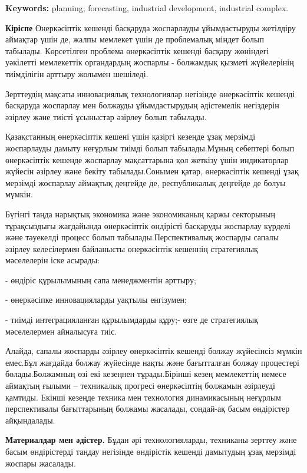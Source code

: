 {\bfseries Keywords:} planning, forecasting, industrial development,
industrial complex.
\begin{multicols}{2}

{\bfseries Кіріспе} Өнеркәсіптік кешенді басқаруда жоспарлауды
ұйымдастыруды жетілдіру аймақтар үшін де, жалпы мемлекет үшін де
проблемалық міндет болып табылады. Көрсетілген проблема өнеркәсіптік
кешенді басқару жөніндегі уәкілетті мемлекеттік органдардың жоспарлы -
болжамдық қызметі жүйелерінің тиімділігін арттыру жолымен шешіледі.

Зерттеудің мақсаты инновациялық технологиялар негізінде өнеркәсіптік
кешенді басқаруда жоспарлау мен болжауды ұйымдастырудың әдістемелік
негіздерін әзірлеу және тиісті ұсыныстар әзірлеу болып табылады.

Қазақстанның өнеркәсіптік кешені үшін қазіргі кезеңде ұзақ мерзімді
жоспарлауды дамыту неғұрлым тиімді болып табылады.Мұның себептері болып
өнеркәсіптік кешенде жоспарлау мақсаттарына қол жеткізу үшін
индикаторлар жүйесін әзірлеу және бекіту табылады.Сонымен қатар,
өнеркәсіптік кешенді ұзақ мерзімді жоспарлау аймақтық деңгейде де,
республикалық деңгейде де болуы мүмкін.

Бүгінгі таңда нарықтық экономика және экономиканың қаржы секторының
тұрақсыздығы жағдайында өнеркәсіптік өндірісті басқаруды жоспарлау
күрделі және тәуекелді процесс болып табылады.Перспективалық жоспарды
сапалы әзірлеу келесілермен байланысты өнеркәсіптік кешеннің
стратегиялық мәселелерін іске асырады:

- өндіріс құрылымының сапа менеджментін арттыру;

- өнеркәсіпке инновацияларды уақтылы енгізумен;

- тиімді интеграцияланған құрылымдарды құру;- өзге де стратегиялық
мәселелермен айналысуға тиіс.

Алайда, сапалы жоспарды әзірлеу өнеркәсіптік кешенді болжау жүйесінсіз
мүмкін емес.Бұл жағдайда болжау жүйесінде нақты және бағытталған болжау
процестері болады.Болжамның өзі екі кезеңнен тұрады.Бірінші кезең
мемлекеттің немесе аймақтың ғылыми -- техникалық прогресі өнеркәсіптің
болжамын әзірлеуді қамтиды. Екінші кезеңде техника мен технология
динамикасының неғұрлым перспективалы бағыттарының болжамы жасалады,
сондай-ақ басым өндірістер айқындалады.

{\bfseries Материалдар мен әдістер.} Бұдан әрі технологияларды, техниканы
зерттеу және басым өндірістерді таңдау негізінде өндірістік кешенді
дамытудың ұзақ мерзімді жоспары жасалады.


\end{multicols}

